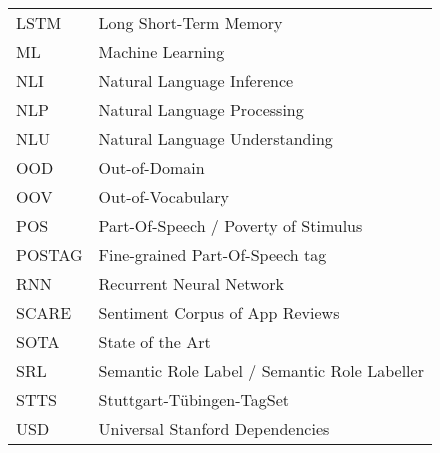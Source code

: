\begin{supertabular}{lp{12.5cm}}
LSTM    & Long Short-Term Memory\\
ML      & Machine Learning\\
NLI     & Natural Language Inference\\
NLP     & Natural Language Processing\\
NLU     & Natural Language Understanding\\
OOD     & Out-of-Domain\\
OOV     & Out-of-Vocabulary\\
POS     & Part-Of-Speech / Poverty of Stimulus\\
POSTAG  & Fine-grained Part-Of-Speech tag\\
RNN     & Recurrent Neural Network\\
SCARE   & Sentiment Corpus of App Reviews\\
SOTA    & State of the Art\\
SRL     & Semantic Role Label / Semantic Role Labeller\\
STTS    & Stuttgart-Tübingen-TagSet\\
USD     & Universal Stanford Dependencies\\
\end{supertabular}

\newpage

